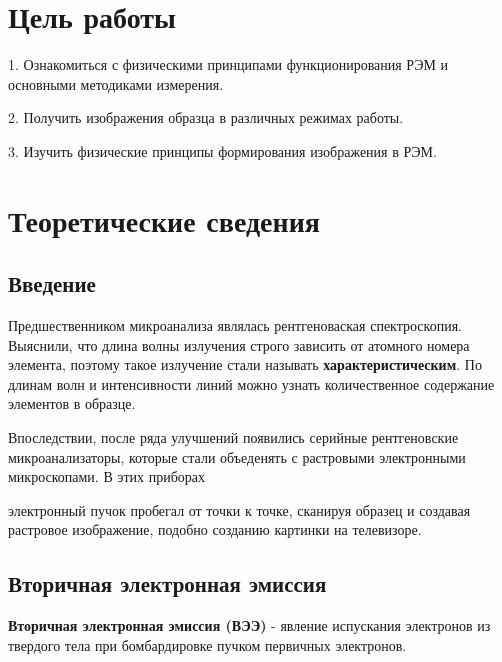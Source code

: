 \documentclass[12pt]{article}
\begin{document}
\newpage

\thispagestyle{empty} %
\renewcommand{\contentsname}{ОГЛАВЛЕНИЕ} %
\tableofcontents

\newpage

\section{Цель работы}

1. Ознакомиться с физическими принципами функционирования РЭМ и основными методиками измерения.\par

2. Получить изображения образца в различных режимах работы.\par

3. Изучить физические принципы формирования изображения в РЭМ.\par

\section{Теоретические сведения}

\subsection{Введение}

Предшественником микроанализа являлась рентгеноваская спектроскопия. Выяснили, что длина волны излучения строго зависить от атомного номера элемента, поэтому такое излучение стали называть \textbf{характеристическим}. По длинам волн и интенсивности линий можно узнать количественное содержание элементов в образце.\par

Впоследствии, после ряда улучшений появились серийные рентгеновские микроанализаторы, которые стали объеденять с растровыми электронными микроскопами. В этих приборах

электронный пучок пробегал от точки к точке, сканируя образец и создавая растровое изображение, подобно созданию картинки на телевизоре.

\subsection{Вторичная электронная эмиссия}

\textbf{Вторичная электронная эмиссия (ВЭЭ)} - явление испускания электронов из твердого тела при бомбардировке пучком первичных электронов.
\end{document}
